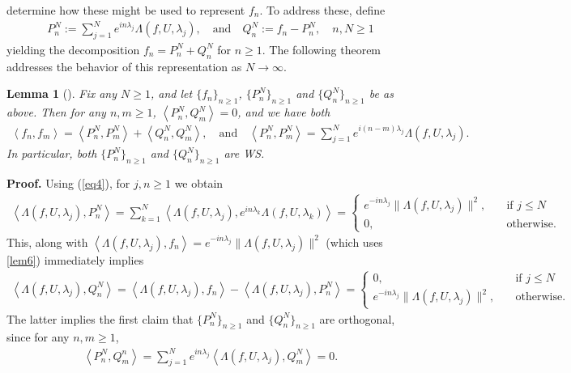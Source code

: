 \documentclass[11pt]{report}
\newcommand{\ip}[2]{\left\langle#1,#2\right\rangle }
\newtheorem{lemma}{Lemma}[section]
\theoremstyle{definition}
\begin{document}
    determine how these might be used to represent $f_n$. To address these, define
    \begin{align}
        P^N_n:=\sum_{j=1}^Ne^{in\lambda_j}\Lambda(f,U,\lambda_j),\quad\text{and}\quad Q^N_n:=f_n-P^N_n,\quad n,N\geq 1
    \end{align}
    yielding the decomposition $f_n=P^N_n+Q^N_n$ for $n\geq 1$. The following theorem addresses the behavior of this
    representation as $N\rightarrow\infty$.
    \begin{lemma}[{\cite[\S6]{Fan_1946}}]\label{lem7}
        Fix any $N\geq 1$, and let $\{f_n\}_{n\geq 1}$, $\{P^N_n\}_{n\geq 1}$ and $\{Q^N_n\}_{n\geq 1}$ be as above. 
        Then for any $n,m\geq 1$, $\ip{P^N_n}{Q^N_m}=0$, and we have both
        \begin{align*}
            \ip{f_n}{f_m}=\ip{P^N_n}{P^N_m}+\ip{Q^N_n}{Q^N_m},\quad\text{and}\quad\ip{P^N_n}{P^N_m}=\sum_{j=1}^N e^{i(n-m)\lambda_j}\Lambda(f,U,\lambda_j).
        \end{align*}
        In particular, both $\{P^N_n\}_{n\geq 1}$ and $\{Q^N_n\}_{n\geq 1}$ are WS.
    \end{lemma}
    \noindent\textbf{Proof.} Using (\ref{eq4}), for $j,n\geq1$ we obtain
    \begin{align*}
        \ip{\Lambda(f,U,\lambda_j)}{P^N_n}=\sum_{k=1}^N\ip{\Lambda(f,U,\lambda_j)}{e^{in\lambda_k}\Lambda(f,U,\lambda_k)}=\begin{cases}
            e^{-in\lambda_j}\|\Lambda(f,U,\lambda_j)\|^2,\quad&\text{if $j\leq N$}\\
            0,\quad&\text{otherwise.}
        \end{cases}
    \end{align*}
    This, along with $\ip{\Lambda(f,U,\lambda_j)}{f_n}=e^{-in\lambda_j}\|\Lambda(f,U,\lambda_j)\|^2$ (which uses \ref{lem6}) immediately implies
    \begin{align*}
        \ip{\Lambda(f,U,\lambda_j)}{Q^N_n}=\ip{\Lambda(f,U,\lambda_j)}{f_n}-\ip{\Lambda(f,U,\lambda_j)}{P^N_n}=\begin{cases}
            0,\quad&\text{if $j\leq N$}\\
            e^{-in\lambda_j}\|\Lambda(f,U,\lambda_j)\|^2,\quad&\text{otherwise.}
        \end{cases}
    \end{align*}
    The latter implies the first claim that $\{P^N_n\}_{n\geq 1}$ and $\{Q^N_n\}_{n\geq 1}$ are orthogonal, since for any $n,m\geq 1$,
    \begin{align*}
        \ip{P^N_n}{Q^n_m}=\sum_{j=1}^Ne^{in\lambda_j}\ip{\Lambda(f,U,\lambda_j)}{Q^N_m}=0.
    \end{align*}
\end{document}
